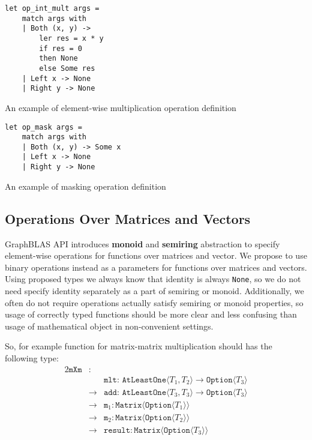 \begin{listing}[h]
    \begin{verbatim}
let op_int_mult args =
    match args with
    | Both (x, y) -> 
        ler res = x * y 
        if res = 0 
        then None 
        else Some res 
    | Left x -> None
    | Right y -> None
    \end{verbatim}
    \caption{An example of element-wise multiplication operation definition}
    \label{lst:opIntMult}
\end{listing}

\begin{listing}[h]
    \begin{verbatim}
let op_mask args =
    match args with
    | Both (x, y) -> Some x
    | Left x -> None
    | Right y -> None
    \end{verbatim}
    \caption{An example of masking operation definition}
    \label{lst:opMask}
\end{listing}

\subsection{Operations Over Matrices and Vectors}

GraphBLAS API introduces \textbf{monoid} and \textbf{semiring} abstraction to specify element-wise operations for functions over matrices and vector.
We propose to use binary operations instead as a parameters for functions over matrices and vectors. 
Using proposed types we always know that identity is always \texttt{None}, so we do not need specify identity separately as a part of semiring or monoid.
Additionally, we often do not require operations actually satisfy semiring or monoid properties, so usage of correctly typed functions should be more clear and less confusing than usage of mathematical object in non-convenient settings.

So, for example function for matrix-matrix multiplication should has the following type:
\begin{alignat*}{2}
    \texttt{mXm} & : & \\ 
        &   & \texttt{mlt: AtLeastOne} \langle T_1, T_2 \rangle \to \texttt{Option} \langle T_3 \rangle \\
        & \to & \texttt{add: AtLeastOne} \langle T_3, T_3 \rangle \to \texttt{Option} \langle T_3 \rangle \\
        & \to & \texttt{m}_1: \texttt{Matrix} \langle \texttt{Option} \langle T_1\rangle \rangle \\
        & \to & \texttt{m}_2: \texttt{Matrix} \langle \texttt{Option} \langle T_2 \rangle \rangle \\
        & \to & \texttt{result}: \texttt{Matrix} \langle \texttt{Option} \langle T_3\rangle \rangle
\end{alignat*}

